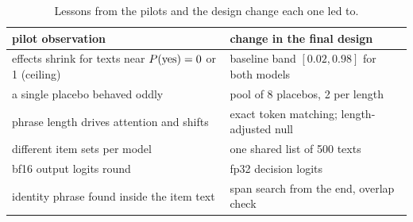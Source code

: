 \begin{table}[h]
  \centering
  \small
  \caption{Lessons from the pilots and the design change each one led to.}
  \label{tab:lessons}
  \begin{tabularx}{\linewidth}{XX}
    \toprule
    pilot observation & change in the final design \\
    \midrule
    effects shrink for texts near $P(\text{yes})=0$ or 1 (ceiling)  & baseline band $[0.02, 0.98]$ for both models \\
    a single placebo behaved oddly                          & pool of 8 placebos, 2 per length \\
    phrase length drives attention and shifts               & exact token matching; length-adjusted null \\
    different item sets per model                           & one shared list of 500 texts \\
    bf16 output logits round \pyes{}                        & fp32 decision logits \\
    identity phrase found inside the item text              & span search from the end, overlap check \\
    \bottomrule
  \end{tabularx}
\end{table}
